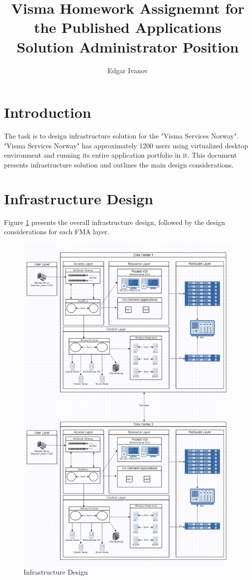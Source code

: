\documentclass[a4paper]{article}
\title{Visma Homework Assignemnt for the Published Applications Solution Administrator Position}
\author{Edgar Ivanov}
\begin{document}
	\maketitle
	
	\section{Introduction}
	The task is to design infrastructure solution for the "Visma Services Norway". "Visma Services Norway" has approximately 1200 users using virtualized desktop environment and running its entire application portfolio in it. This document presents infrastructure solution and outlines the main design considerations.
	
	\section{Infrastructure Design}
	Figure \ref{fig:Diagram} presents the overall infrastructure design, followed by the design considerations for each FMA layer.
	
	\begin{figure}
		\centering
		\includegraphics[width=1\textwidth]{InfrastructureDesign.png}
		\caption{\label{fig:Diagram}Infrastructure Design}
	\end{figure}
	
\end{document}

